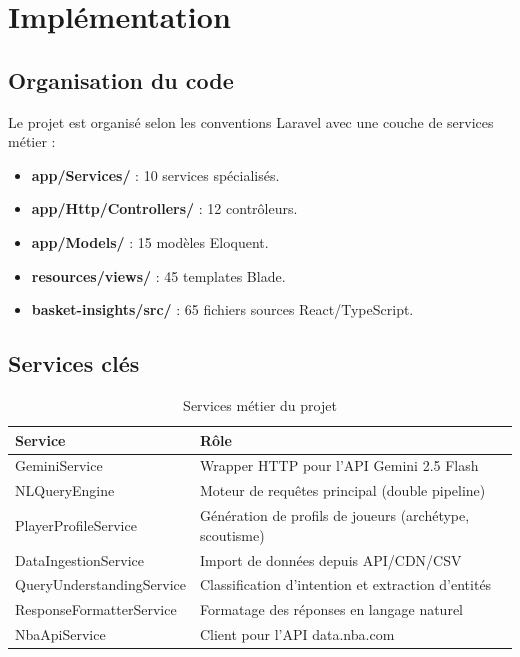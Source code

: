 \documentclass[12pt,a4paper]{report}
\begin{document}
\section{Implémentation}

\subsection{Organisation du code}

Le projet est organisé selon les conventions Laravel avec une couche de services métier :

\begin{itemize}
    \item \textbf{app/Services/} : 10 services spécialisés.
    \item \textbf{app/Http/Controllers/} : 12 contrôleurs.
    \item \textbf{app/Models/} : 15 modèles Eloquent.
    \item \textbf{resources/views/} : 45 templates Blade.
    \item \textbf{basket-insights/src/} : 65 fichiers sources React/TypeScript.
\end{itemize}

\subsection{Services clés}

\begin{table}[h]
\centering
\begin{tabularx}{\textwidth}{lX}
\toprule
\textbf{Service} & \textbf{Rôle} \\
\midrule
GeminiService & Wrapper HTTP pour l'API Gemini 2.5 Flash \\
NLQueryEngine & Moteur de requêtes principal (double pipeline) \\
PlayerProfileService & Génération de profils de joueurs (archétype, scoutisme) \\
DataIngestionService & Import de données depuis API/CDN/CSV \\
QueryUnderstandingService & Classification d'intention et extraction d'entités \\
ResponseFormatterService & Formatage des réponses en langage naturel \\
NbaApiService & Client pour l'API data.nba.com \\
\bottomrule
\end{tabularx}
\caption{Services métier du projet}
\end{table}
\end{document}
